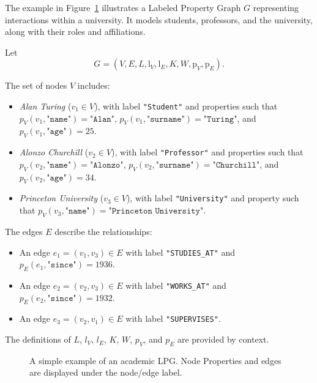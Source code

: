 \begin{example}
\sloppy
    The example in Figure~\ref{fig:acadamic_graph_example} illustrates a Labeled Property Graph $G$ representing interactions within a university. It models students, professors, and the university, along with their roles and affiliations.

    Let
    \[
        G = (V, E, L, \mathrm{l}_V, \mathrm{l}_E, K, W, \mathrm{p}_V, \mathrm{p}_E).
    \]

    The set of nodes $V$ includes:
    \begin{itemize}
        \item \emph{Alan Turing} ($v_1 \in V$), with label \texttt{"Student"} and properties such that \( p_V(v_1, \texttt{"name"}) = \texttt{"Alan"} \), \( p_V(v_1, \texttt{"surname"}) = \texttt{"Turing"} \), and \( p_V(v_1, \texttt{"age"}) = 25 \).
        \item \emph{Alonzo Churchill} ($v_2 \in V$), with label \texttt{"Professor"} and properties such that \( p_V(v_2, \texttt{"name"}) = \texttt{"Alonzo"} \), \( p_V(v_2, \texttt{"surname"}) = \texttt{"Churchill"} \), and \( p_V(v_2, \texttt{"age"}) = 34 \).
        \item \emph{Princeton University} ($v_3 \in V$), with label \texttt{"University"} and property such that \( p_V(v_3, \texttt{"name"}) = \texttt{"Princeton University"} \).
    \end{itemize}

    The edges $E$ describe the relationships:
    \begin{itemize}
        \item An edge $e_1 = (v_1, v_3) \in E$ with label \texttt{"STUDIES\_AT"} and \( p_E(e_1, \texttt{"since"}) = 1936 \).
        \item An edge $e_2 = (v_2, v_3) \in E$ with label \texttt{"WORKS\_AT"} and \( p_E(e_2, \texttt{"since"}) = 1932\).
        \item An edge $e_3 = (v_2, v_1) \in E$ with label \texttt{"SUPERVISES"}.
    \end{itemize}

    The definitions of $L$, $l_V$, $l_E$, $K$, $W$, $p_V$, and $p_E$ are provided by context.

    \begin{figure}[h]
    \centering
    \resizebox{\textwidth}{!}{ %
    
    }
    \caption{A simple example of an academic LPG. Node Properties and edges are displayed under the node/edge label.\label{fig:acadamic_graph_example}}
    \end{figure}
\end{example}
\par\fussy



